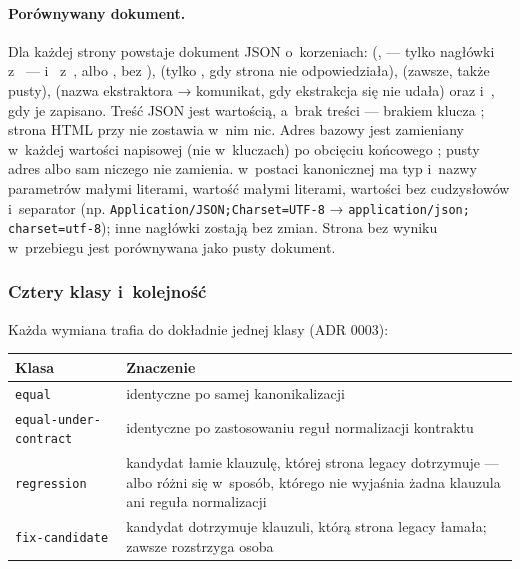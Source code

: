 \paragraph{Porównywany dokument.} Dla każdej strony powstaje dokument JSON o~korzeniach:
 (,  --- tylko nagłówki
z~ --- i~ z~,  albo
, bez ),  (tylko , gdy strona nie
odpowiedziała),  (zawsze, także pusty),  (nazwa
ekstraktora → komunikat, gdy ekstrakcja się nie udała) oraz  i~,
gdy je zapisano. Treść JSON  jest wartością, a~brak treści --- brakiem klucza
; strona HTML przy  nie zostawia w~nim nic. Adres bazowy jest
zamieniany w~każdej wartości napisowej (nie w~kluczach) po obcięciu końcowego \repopath{/};
pusty adres albo sam \repopath{/} niczego nie zamienia.  w~postaci
kanonicznej ma typ i~nazwy parametrów małymi literami, wartość  małymi
literami, wartości bez cudzysłowów i~separator \repopath{; } (np.
\texttt{Application/JSON;Charset=\textquotedbl{}UTF-8\textquotedbl{}} →
\texttt{application/json; charset=utf-8}); inne nagłówki zostają bez zmian. Strona bez wyniku
w~przebiegu jest porównywana jako pusty dokument.

\subsubsection{Cztery klasy i~kolejność}

Każda wymiana trafia do dokładnie jednej klasy (ADR 0003):

{\small
\begin{tabularx}{\linewidth}{@{}l >{\raggedright\arraybackslash}X@{}}
\toprule
Klasa & Znaczenie \\
\midrule
\texttt{equal} & identyczne po samej kanonikalizacji \\
\texttt{equal-under-contract} & identyczne po zastosowaniu reguł normalizacji kontraktu \\
\texttt{regression} & kandydat łamie klauzulę, której strona legacy dotrzymuje --- albo różni
się w~sposób, którego nie wyjaśnia żadna klauzula ani reguła normalizacji \\
\texttt{fix-candidate} & kandydat dotrzymuje klauzuli, którą strona legacy łamała; zawsze
rozstrzyga osoba \\
\bottomrule
\end{tabularx}
}

